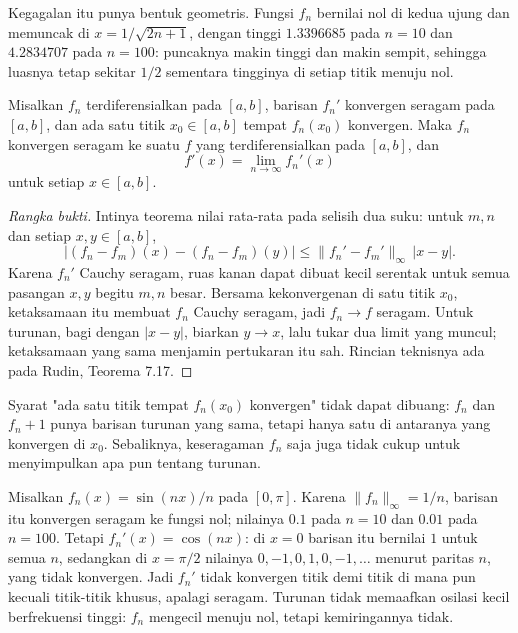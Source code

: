 Kegagalan itu punya bentuk geometris. Fungsi $f_n$ bernilai nol di kedua ujung
dan memuncak di $x=1/\sqrt{2n+1}$, dengan tinggi $1.3396685$ pada $n=10$ dan
$4.2834707$ pada $n=100$: puncaknya makin tinggi dan makin sempit, sehingga
luasnya tetap sekitar $1/2$ sementara tingginya di setiap titik menuju nol.

\begin{teorema}
Misalkan $f_n$ terdiferensialkan pada $[a,b]$, barisan $f_n'$ konvergen seragam
pada $[a,b]$, dan ada satu titik $x_0\in[a,b]$ tempat $f_n(x_0)$ konvergen.
Maka $f_n$ konvergen seragam ke suatu $f$ yang terdiferensialkan pada $[a,b]$,
dan
\[
  f'(x)=\lim_{n\to\infty}f_n'(x)
\]
untuk setiap $x\in[a,b]$.
\end{teorema}

\begin{proof}[Rangka bukti]
Intinya teorema nilai rata-rata pada selisih dua suku: untuk $m,n$ dan setiap
$x,y\in[a,b]$,
\[
  \bigl|(f_n-f_m)(x)-(f_n-f_m)(y)\bigr|\le\|f_n'-f_m'\|_\infty\,|x-y| .
\]
Karena $f_n'$ Cauchy seragam, ruas kanan dapat dibuat kecil serentak untuk semua
pasangan $x,y$ begitu $m,n$ besar. Bersama kekonvergenan di satu titik $x_0$,
ketaksamaan itu membuat $f_n$ Cauchy seragam, jadi $f_n\to f$ seragam. Untuk
turunan, bagi dengan $|x-y|$, biarkan $y\to x$, lalu tukar dua limit yang
muncul; ketaksamaan yang sama menjamin pertukaran itu sah. Rincian teknisnya ada
pada Rudin, Teorema 7.17.
\end{proof}

Syarat "ada satu titik tempat $f_n(x_0)$ konvergen" tidak dapat dibuang: $f_n$
dan $f_n+1$ punya barisan turunan yang sama, tetapi hanya satu di antaranya yang
konvergen di $x_0$. Sebaliknya, keseragaman $f_n$ saja juga tidak cukup untuk
menyimpulkan apa pun tentang turunan.

\begin{contoh}
Misalkan $f_n(x)=\sin(nx)/n$ pada $[0,\pi]$. Karena $\|f_n\|_\infty=1/n$,
barisan itu konvergen seragam ke fungsi nol; nilainya $0.1$ pada $n=10$ dan
$0.01$ pada $n=100$. Tetapi $f_n'(x)=\cos(nx)$: di $x=0$ barisan itu bernilai
$1$ untuk semua $n$, sedangkan di $x=\pi/2$ nilainya $0,-1,0,1,0,-1,\ldots$
menurut paritas $n$, yang tidak konvergen. Jadi $f_n'$ tidak konvergen titik
demi titik di mana pun kecuali titik-titik khusus, apalagi seragam. Turunan
tidak memaafkan osilasi kecil berfrekuensi tinggi: $f_n$ mengecil menuju nol,
tetapi kemiringannya tidak.
\end{contoh}


